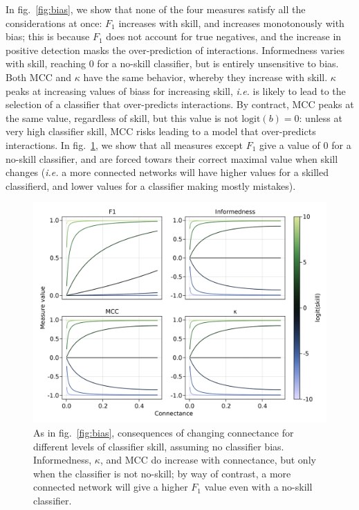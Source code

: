 \documentclass[11pt]{article}
\makeatletter
\def\maxwidth{\ifdim\Gin@nat@width>\linewidth\linewidth
\else\Gin@nat@width\fi}
\let\Oldincludegraphics\includegraphics
\renewcommand{\includegraphics}[1]{\Oldincludegraphics[width=\maxwidth]{#1}}
\makeatother
\begin{document}
In fig.~\ref{fig:bias}, we show that none of the four measures satisfy
all the considerations at once: \(F_1\) increases with skill, and
increases monotonously with bias; this is because \(F_1\) does not
account for true negatives, and the increase in positive detection masks
the over-prediction of interactions. Informedness varies with skill,
reaching 0 for a no-skill classifier, but is entirely unsensitive to
bias. Both MCC and \(\kappa\) have the same behavior, whereby they
increase with skill. \(\kappa\) peaks at increasing values of biass for
increasing skill, \emph{i.e.} is likely to lead to the selection of a
classifier that over-predicts interactions. By contract, MCC peaks at
the same value, regardless of skill, but this value is not
\(\text{logit}(b)=0\): unless at very high classifier skill, MCC risks
leading to a model that over-predicts interactions. In
fig.~\ref{fig:connectance}, we show that all measures except \(F_1\)
give a value of 0 for a no-skill classifier, and are forced towars their
correct maximal value when skill changes (\emph{i.e.} a more connected
networks will have higher values for a skilled classifierd, and lower
values for a classifier making mostly mistakes).

\begin{figure}
\hypertarget{fig:connectance}{%
\centering
\includegraphics{figures/changing-connectance.png}
\caption{As in fig.~\ref{fig:bias}, consequences of changing connectance
for different levels of classifier skill, assuming no classifier bias.
Informedness, \(\kappa\), and MCC do increase with connectance, but only
when the classifier is not no-skill; by way of contrast, a more
connected network will give a higher \(F_1\) value even with a no-skill
classifier.}\label{fig:connectance}
}
\end{figure}
\end{document}
